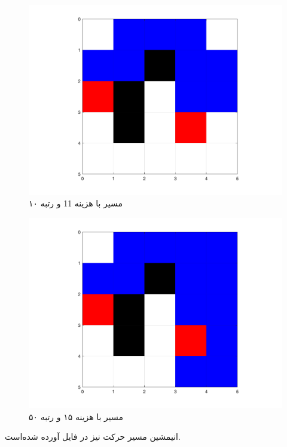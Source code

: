  \begin{figure}[!h]
	\includegraphics[width=12cm]{../Figure/Q3/10th_path.png}
	\centering
 	\caption{مسیر با هزینه 11 و رتبه ۱۰}
\end{figure}

 \begin{figure}[!h]
	\includegraphics[width=12cm]{../Figure/Q3/50th_path.png}
	\centering
 	\caption{مسیر با هزینه ۱۵ و رتبه ۵۰}
\end{figure}





انیمشین مسیر حرکت نیز در فایل
آورده شده‌است.